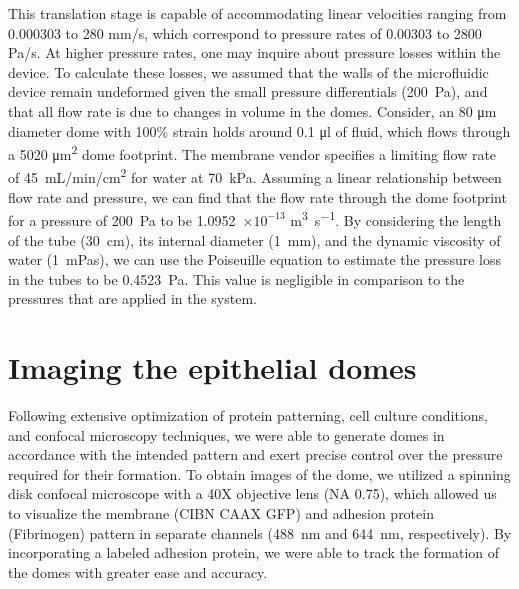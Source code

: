 This translation stage is capable of accommodating linear velocities ranging from 0.000303 to 280 \unit{mm/s}, which correspond to pressure rates of 0.00303 to 2800 \unit{Pa/s}. At higher pressure rates, one may inquire about pressure losses within the device. To calculate these losses, we assumed that the walls of the microfluidic device remain undeformed given the small pressure differentials (200~Pa), and that all flow rate is due to changes in volume in the domes. Consider, an 80 \unit{\um} diameter dome with 100\% strain holds around 0.1 \unit{\ul} of fluid, which flows through a 5020 \unit{\micro\meter\squared} dome footprint. The membrane vendor specifies a limiting flow rate of 45~\unit{mL/min/cm^2} for water at 70~kPa. Assuming a linear relationship between flow rate and pressure, we can find that the flow rate through the dome footprint for a pressure of 200~Pa to be 1.0952~$\times 10^{-13}$ \unit{\cubic\meter\per\second}. By considering the length of the tube (30~cm), its internal diameter (1~mm), and the dynamic viscosity of water (1~mPas), we can use the Poiseuille equation to estimate the pressure loss in the tubes to be 0.4523~Pa. This value is negligible in comparison to the pressures that are applied in the system.


\hypertarget{imaging-the-epithelial-domes}{%
\section{Imaging the epithelial
domes}\label{imaging-the-epithelial-domes}}

Following extensive optimization of protein patterning, cell culture conditions, and confocal microscopy techniques, we were able to generate domes in accordance with the intended pattern and exert precise control over the pressure required for their formation. To obtain images of the dome, we utilized a spinning disk confocal microscope with a 40X objective lens (NA 0.75), which allowed us to visualize the membrane (CIBN CAAX GFP) and adhesion protein (Fibrinogen) pattern in separate channels (488~\unit{\nm} and 644~\unit{\nm}, respectively). By incorporating a labeled adhesion protein, we were able to track the formation of the domes with greater ease and accuracy.

